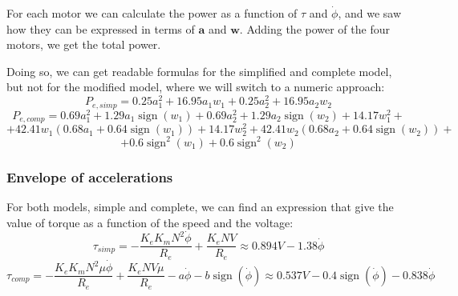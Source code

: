 \documentclass[12pt]{article}
\renewcommand{\vec}[1]{\bm{#1}}
\begin{document}
For each motor we can calculate the power as a function of $\tau$ and $\dot\phi$, and we saw how they can be expressed in terms of $\vec a$ and $\vec w$. Adding the power of the four motors, we get the total power.

Doing so, we can get readable formulas for the simplified and complete model, but not for the modified model, where we will switch to a numeric approach:
$$P_{e, simp} = 0.25 a_{1}^{2} + 16.95 a_{1} w_{1} + 0.25 a_{2}^{2} + 16.95 a_{2} w_{2}$$
$$P_{e, comp} = 0.69 a_{1}^{2} + 1.29 a_{1} \operatorname{sign}\left(w_{1}\right) + 0.69 a_{2}^{2} + 1.29 a_{2} \operatorname{sign}\left(w_{2}\right) + 14.17 w_{1}^{2} +$$
$$+ 42.41 w_{1} \left(0.68 a_{1} + 0.64 \operatorname{sign}\left(w_{1}\right)\right) + 14.17 w_{2}^{2} + 42.41 w_{2} \left(0.68 a_{2} + 0.64 \operatorname{sign}\left(w_{2}\right)\right) +$$
$$+ 0.6 \operatorname{sign}^{2}\left(w_{1}\right) + 0.6 \operatorname{sign}^{2}\left(w_{2}\right)$$
\subsubsection{Envelope of accelerations}
For both models, simple and complete, we can find an expression that give the value of torque as a function of the speed and the voltage:
$$\tau_{simp} = \displaystyle - \frac{K_{e} K_{m} N^{2} \dot{\phi}}{R_{e}} + \frac{K_{e} N V}{R_{e}} \approx 0.894 V - 1.38 \dot{\phi}$$
$$\tau_{comp} = - \frac{K_{e} K_{m} N^{2} \mu \dot{\phi}}{R_{e}} + \frac{K_{e} N V \mu}{R_{e}} - a \dot{\phi} - b \operatorname{sign}\left(\dot{\phi}\right)\approx 0.537 V - 0.4 \operatorname{sign}\left(\dot{\phi}\right) - 0.838 \dot{\phi}$$
\end{document}

